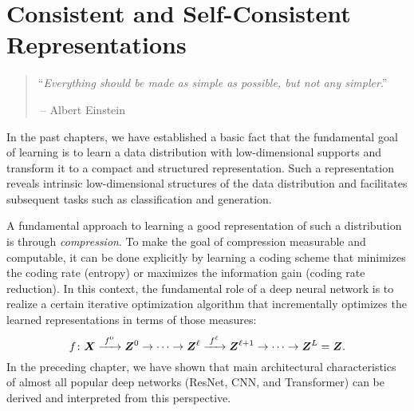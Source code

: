 \documentclass[\toplevelprefix/book-main.tex]{subfiles}
\begin{document}
\chapter{Consistent and Self-Consistent Representations}
\label{ch:consistent}\label{ch:autoencoding}
\label{ch:self-consistent}\label{ch:closed-loop}

\begin{quote}
\hfill  ``{\em Everything should be made as simple as possible, but not any simpler}.''

$~$\hfill -- Albert Einstein
\end{quote}



\vspace{5mm}


In the past chapters, we have established a basic fact that the
fundamental goal of learning is to learn a data
distribution with low-dimensional supports and transform it to a compact and structured
representation. Such a representation reveals intrinsic
low-dimensional structures of the data distribution and facilitates
subsequent tasks such as classification and generation.

A fundamental approach to learning a good representation of such a
distribution is through {\em compression}. To make the
goal of compression measurable and computable, it can be done
explicitly by learning a coding scheme that minimizes the coding rate (entropy) or maximizes the information gain (coding rate
reduction). In this context, the fundamental role of a deep neural
network is to realize a certain iterative optimization algorithm that
incrementally optimizes the learned representations in terms of those measures:
\begin{equation}
  f\colon \bm{X}
  \xrightarrow{\hspace{1mm} f^0 \hspace{1mm}} \bm{Z}^0 \rightarrow \cdots
  \rightarrow \bm{Z}^\ell \xrightarrow{\hspace{1mm} f^\ell \hspace{1mm}}
  \bm{Z}^{\ell+1} \rightarrow  \cdots \to \bm{Z}^L = \bm{Z}.
\end{equation}
In the preceding chapter, we have shown that main architectural
characteristics of almost all popular deep networks (ResNet, CNN, and
Transformer) can be derived and interpreted from this perspective.
\end{document}
